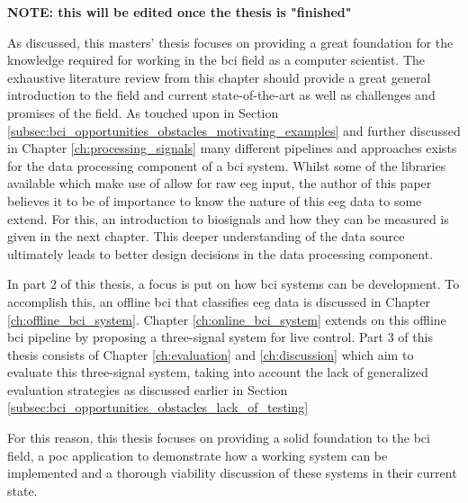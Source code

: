 \textbf{NOTE: this will be edited once the thesis is "finished"}

As discussed, this masters' thesis focuses on providing a great foundation for the knowledge required for working in the \gls{bci} field as a computer scientist.
The exhaustive literature review from this chapter should provide a great general introduction to the field and current state-of-the-art as well as challenges and promises of the field.
As touched upon in Section \ref{subsec:bci_opportunities_obstacles_motivating_examples} and further discussed in Chapter \ref{ch:processing_signals} many different pipelines and approaches exists for the data processing component of a \gls{bci} system.
Whilst some of the libraries available which make use of  allow for raw \gls{eeg} input, the author of this paper believes it to be of importance to know the nature of this \gls{eeg} data to some extend.
For this, an introduction to \glspl{biosignal} and how they can be measured is given in the next chapter.
This deeper understanding of the data source ultimately leads to better design decisions in the data processing component.

In part 2 of this thesis, a focus is put on how \gls{bci} systems can be development.
To accomplish this, an offline \gls{bci} that classifies \gls{eeg} data is discussed in Chapter \ref{ch:offline_bci_system}.
Chapter \ref{ch:online_bci_system} extends on this offline \gls{bci} pipeline by proposing a three-signal system for live control.
Part 3 of this thesis consists of Chapter \ref{ch:evaluation} and \ref{ch:discussion} which aim to evaluate this three-signal system, taking into account the lack of generalized evaluation strategies as discussed earlier in Section \ref{subsec:bci_opportunities_obstacles_lack_of_testing}

For this reason, this thesis focuses on providing a solid foundation to the \gls{bci} field, a \gls{poc} application to demonstrate how a working system can be implemented and a thorough viability discussion of these systems in their current state.